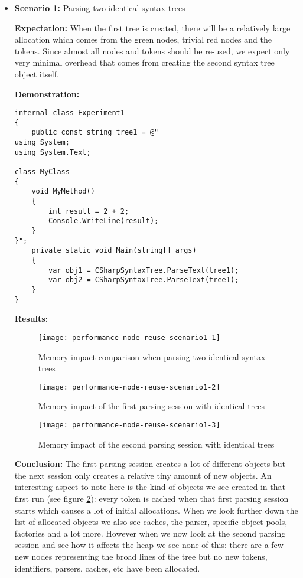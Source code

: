 \begin{itemize}
\item \textbf{Scenario 1:} Parsing two identical syntax trees

\textbf{Expectation:} When the first tree is created, there will be a relatively large allocation which comes from the green nodes, trivial red nodes and the tokens. Since almost all nodes and tokens should be re-used, we expect only very minimal overhead that comes from creating the second syntax tree object itself.

\textbf{Demonstration:} 

\begin{lstlisting}
internal class Experiment1
{
	public const string tree1 = @"
using System;
using System.Text;

class MyClass 
{
    void MyMethod()
    {
        int result = 2 + 2;
        Console.WriteLine(result);
    }
}";
	private static void Main(string[] args)
	{
		var obj1 = CSharpSyntaxTree.ParseText(tree1);
		var obj2 = CSharpSyntaxTree.ParseText(tree1);
	}
}
\end{lstlisting}

\textbf{Results:}

\begin{figure}[H]
\centering
\texttt{[image: performance-node-reuse-scenario1-1]}
\caption{Memory impact comparison when parsing two identical syntax trees}
\label{img:performance-node-reuse-scenario1-1}
\end{figure}

\begin{figure}[H]
\centering
\texttt{[image: performance-node-reuse-scenario1-2]}
\caption{Memory impact of the first parsing session with identical trees}
\label{img:performance-node-reuse-scenario1-2}
\end{figure}

\begin{figure}[H]
\centering
\texttt{[image: performance-node-reuse-scenario1-3]}
\caption{Memory impact of the second parsing session with identical trees}
\label{img:performance-node-reuse-scenario1-3}
\end{figure}

\textbf{Conclusion:} The first parsing session creates a lot of different objects but the next session only creates a relative tiny amount of new objects. An interesting aspect to note here is the kind of objects we see created in that first run (see figure \ref{img:performance-node-reuse-scenario1-2}): every token is cached when that first parsing session starts which causes a lot of initial allocations. 
When we look further down the list of allocated objects we also see caches, the parser, specific object pools, factories and a lot more. However when we now look at the second parsing session and see how it affects the heap we see none of this: there are a few new nodes representing the broad lines of the tree but no new tokens, identifiers, parsers, caches, etc have been allocated.



\end{itemize}
